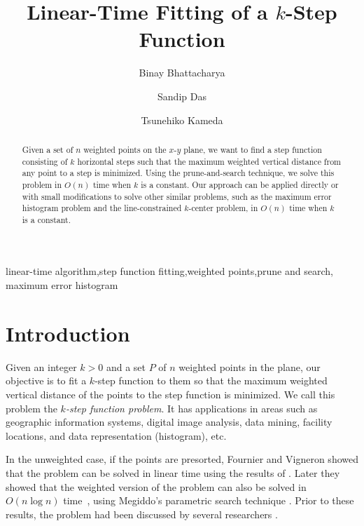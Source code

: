\documentclass[preprint,10pt]{elsarticle}
\begin{document}
\begin{frontmatter}

\title{Linear-Time Fitting of a $k$-Step Function}\author{Binay Bhattacharya }
\address{School of Computing Science, Simon Fraser University,
Burnaby, Canada}
\author{Sandip Das}
\address{Advanced Computing and Microelectronics Unit, Indian Stat. Inst., Kolkata, India}
\author{Tsunehiko Kameda}
\address{School of Computing Science, Simon Fraser University,
Burnaby, Canada}



\begin{abstract}
Given a set of $n$ weighted points on the $x$-$y$ plane,
we want to find a step function consisting of $k$ horizontal steps
such that the maximum weighted vertical distance from any point to a step is minimized.
Using the prune-and-search technique,
we solve this problem in $O(n)$ time when $k$ is a constant.
Our approach can be applied directly or with small modifications
to solve other similar problems,
such as the maximum error histogram problem
and the line-constrained $k$-center problem,
in $O(n)$ time when $k$ is a constant.
\end{abstract}
\begin{keyword}
linear-time algorithm\sep step function fitting\sep weighted points\sep prune and search\sep
maximum error histogram
\end{keyword}
\end{frontmatter}


\section{Introduction}\label{sec:intro}
Given an integer $k > 0$ and a set $P$ of $n$ weighted points in the plane,
our objective is to fit a $k$-step function to them so that the maximum weighted
vertical distance of the points to the step function is minimized.
We call this problem the {\em $k$-step function problem}.
It has applications in areas such as geographic information systems, 
digital image analysis, data mining, facility locations, and
data representation (histogram), etc.

In the unweighted case, if the points are presorted,
Fournier and Vigneron \cite{fournier2011} showed that
the problem can be solved in linear time using the results of 
\cite{frederickson1991a,frederickson1984,gabow1984}.
Later they showed that the weighted version of the problem can also be solved
in $O(n\log n)$ time~\cite{fournier2013},
using Megiddo's parametric search technique \cite{megiddo1983a}.
Prior to these results, the problem had been discussed by several researchers
\cite{chen2009,diazbanez2001,liu2010,lopez2008,wang2002}. 
\end{document}
